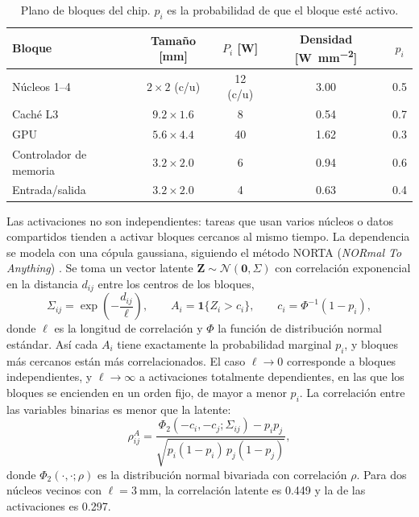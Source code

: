 \documentclass[preprint,11pt,sort&compress]{elsarticle}
\renewcommand{\vec}[1]{\bm{#1}}
\begin{document}
\begin{table}[htbp]
\centering
\caption{Plano de bloques del chip. $p_i$ es la probabilidad de que el bloque esté activo.}
\label{tab:plano}
\small
\begin{tabular}{@{}lcccc@{}}
\toprule
Bloque & Tamaño [\si{\milli\metre}] & $P_i$ [\si{\watt}] & Densidad [\si{\watt\per\milli\metre\squared}] & $p_i$ \\
\midrule
Núcleos 1--4 & $2\times 2$ (c/u) & 12 (c/u) & \num{3.00} & \num{0.5} \\
Caché L3 & $9.2\times 1.6$ & 8 & \num{0.54} & \num{0.7} \\
GPU & $5.6\times 4.4$ & 40 & \num{1.62} & \num{0.3} \\
Controlador de memoria & $3.2\times 2.0$ & 6 & \num{0.94} & \num{0.6} \\
Entrada/salida & $3.2\times 2.0$ & 4 & \num{0.63} & \num{0.4} \\
\bottomrule
\end{tabular}
\end{table}

Las activaciones no son independientes: tareas que usan varios núcleos o datos
compartidos tienden a activar bloques cercanos al mismo tiempo. La dependencia se modela con
una cópula gaussiana, siguiendo el método NORTA (\emph{NORmal To Anything})
\cite{cario1997norta}. Se toma un vector latente $\vec Z\sim\mathcal N(\vec 0,\Sigma)$ con
correlación exponencial en la distancia $d_{ij}$ entre los centros de los bloques,
\begin{equation}
  \Sigma_{ij}=\exp\!\left(-\frac{d_{ij}}{\ell}\right),
  \qquad
  A_i=\mathbf 1\{Z_i>c_i\},\qquad c_i=\Phi^{-1}(1-p_i),
  \label{eq:norta}
\end{equation}
donde $\ell$ es la longitud de correlación y $\Phi$ la función de distribución normal
estándar. Así cada $A_i$ tiene exactamente la probabilidad marginal $p_i$, y bloques más
cercanos están más correlacionados. El caso $\ell\to0$ corresponde a bloques
independientes, y $\ell\to\infty$ a activaciones totalmente dependientes, en las que los
bloques se encienden en un orden fijo, de mayor a menor $p_i$. La
correlación entre las variables binarias es menor que la latente:
\begin{equation}
  \rho^{A}_{ij}=\frac{\Phi_2\!\left(-c_i,-c_j;\Sigma_{ij}\right)-p_ip_j}
  {\sqrt{p_i(1-p_i)\,p_j(1-p_j)}},
  \label{eq:rhoA}
\end{equation}
donde $\Phi_2(\cdot,\cdot;\rho)$ es la distribución normal bivariada con correlación
$\rho$. Para dos núcleos vecinos con $\ell=\SI{3}{\milli\metre}$, la correlación latente es
\num{0.449} y la de las activaciones es \num{0.297}.
\end{document}
